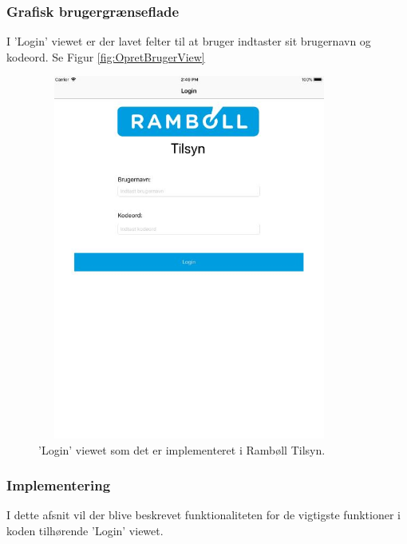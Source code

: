 \subsubsection{Grafisk brugergrænseflade}
I 'Login' viewet er der lavet felter til at bruger indtaster sit brugernavn og kodeord. Se Figur \ref{fig:OpretBrugerView}
\begin{figure}[H] %
	\centering
	\includegraphics[height=12cm, width=10cm]{../ArkitekturDesign/Design/Login/LoginView}
	\caption{'Login' viewet som det er implementeret i Rambøll Tilsyn.}
	\label{fig:LoginView}
\end{figure}

\clearpage

\subsubsection{Implementering}
I dette afsnit vil der blive beskrevet funktionaliteten for de vigtigste funktioner i koden tilhørende 'Login' viewet.

